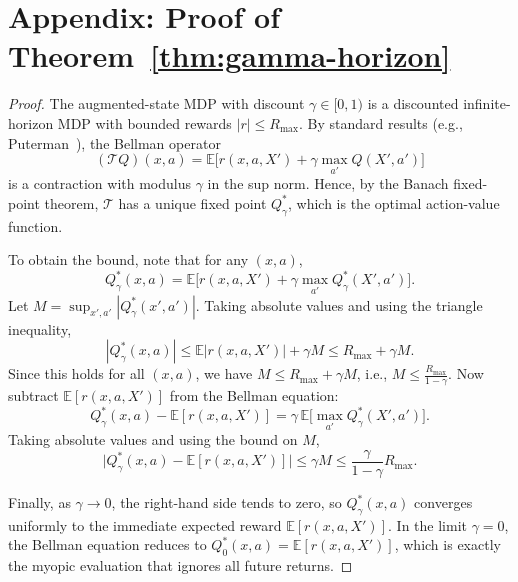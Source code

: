 \documentclass{article}
\begin{document}
\section*{Appendix: Proof of Theorem~\ref{thm:gamma-horizon}}
\begin{proof}
The augmented-state MDP with discount $\gamma \in [0,1)$ is a discounted infinite-horizon MDP with bounded rewards $|r| \le R_{\max}$. By standard results (e.g., Puterman~\cite{puterman2014markov}), the Bellman operator
\[
(\mathcal{T} Q)(x,a) = \mathbb{E}\bigl[r(x,a,X') + \gamma \max_{a'} Q(X',a')\bigr]
\]
is a contraction with modulus $\gamma$ in the sup norm. Hence, by the Banach fixed-point theorem, $\mathcal{T}$ has a unique fixed point $Q^*_\gamma$, which is the optimal action-value function.

To obtain the bound, note that for any $(x,a)$,
\[
Q^*_\gamma(x,a) = \mathbb{E}\bigl[r(x,a,X') + \gamma \max_{a'} Q^*_\gamma(X',a')\bigr].
\]
Let $M = \sup_{x',a'} |Q^*_\gamma(x',a')|$. Taking absolute values and using the triangle inequality,
\[
|Q^*_\gamma(x,a)| \le \mathbb{E}|r(x,a,X')| + \gamma M \le R_{\max} + \gamma M.
\]
Since this holds for all $(x,a)$, we have $M \le R_{\max} + \gamma M$, i.e., $M \le \frac{R_{\max}}{1-\gamma}$. Now subtract $\mathbb{E}[r(x,a,X')]$ from the Bellman equation:
\[
Q^*_\gamma(x,a) - \mathbb{E}[r(x,a,X')] = \gamma\,\mathbb{E}\!\bigl[\max_{a'} Q^*_\gamma(X',a')\bigr].
\]
Taking absolute values and using the bound on $M$,
\[
\bigl|Q^*_\gamma(x,a) - \mathbb{E}[r(x,a,X')]\bigr| \le \gamma M \le \frac{\gamma}{1-\gamma}R_{\max}.
\]

Finally, as $\gamma \to 0$, the right-hand side tends to zero, so $Q^*_\gamma(x,a)$ converges uniformly to the immediate expected reward $\mathbb{E}[r(x,a,X')]$. In the limit $\gamma=0$, the Bellman equation reduces to $Q^*_0(x,a) = \mathbb{E}[r(x,a,X')]$, which is exactly the myopic evaluation that ignores all future returns.


\end{proof}
\end{document}
